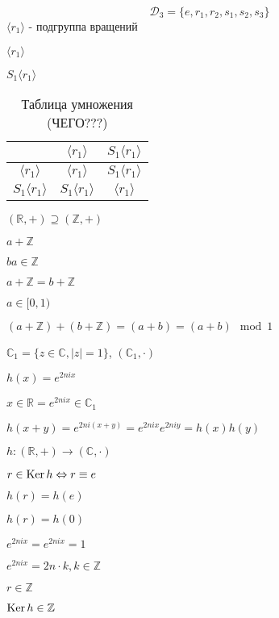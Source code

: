\documentclass[../main/document.tex]{subfiles}
\begin{document}
\begin{exm}
$$\mathcal{D}_3=\{e,r_1,r_2,s_1,s_2,s_3\}$$
$\langle r_1\rangle$ - подгруппа вращений

$\langle r_1\rangle$

$S_1\langle r_1\rangle$

\begin{table}[h]
\centering
\caption*{Таблица умножения (ЧЕГО???)}
\renewcommand*{\arraystretch}{1.4}
\begin{tabular}{c|c|c}
  & $\langle r_1\rangle$ & $S_1\langle r_1\rangle$ \\ \hline
$\langle r_1\rangle$ & $\langle r_1\rangle$ & $S_1\langle r_1\rangle$ \\ \hline
$S_1\langle r_1\rangle$ & $S_1\langle r_1\rangle$ & $\langle r_1\rangle$  \\ 
\end{tabular}
\end{table}
\end{exm}

\begin{exm}
$(\mathbb{R},+)\supseteq (\mathbb{Z},+)$

$a+\mathbb{Z}$

$ba\in \mathbb{Z}$

$a+\mathbb{Z}=b+\mathbb{Z}$

$a\in [0,1)$

$(a+\mathbb{Z})+(b+\mathbb{Z})=(a+b)=(a+b)\mod 1$

$\mathbb{C}_1=\{z\in\mathbb{C},\vert z\vert=1\}$, $(\mathbb{C}_1,\cdot)$

$h(x)=e^{2nix}$

$x\in \mathbb{R}=e^{2nix}\in \mathbb{C}_1$

$h(x+y)=e^{2ni(x+y)}=e^{2nix}e^{2niy}=h(x)h(y)$

$h:(\mathbb{R},+)\rightarrow (\mathbb{C},\cdot)$

$r\in \operatorname{Ker} h \Leftrightarrow r\equiv e$

$h(r)=h(e)$

$h(r)=h(0)$

$e^{2nix}=e^{2nix}=1$

$e^{2nix}=2n\cdot k, k\in \mathbb{Z}$

$r\in \mathbb{Z}$

$\operatorname{Ker} h\in \mathbb{Z}$
\end{exm}
\end{document}
